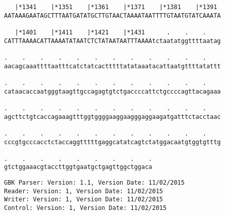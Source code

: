 \documentclass{article}
\begin{document}
\begin{Verbatim}
   |*1341    |*1351    |*1361    |*1371    |*1381    |*1391 
AATAAAGAATAGCTTTAATGATATGCTTGTAACTAAAATAATTTTGTAATGTATCAAATA
  
   |*1401    |*1411    |*1421    |*1431      .    .    .    
CATTTAAAACATTAAAATATAATCTCTATAATAATTTAAAAtctaatatggttttaatag
  
.    .    .    .    .    .    .    .    .    .    .    .    
aacagcaaattttaatttcatctatcactttttatataaatacattaatgttttatattt
  
.    .    .    .    .    .    .    .    .    .    .    .    
cataacaccaatgggtaagttgccagagtgtctgaccccattctgccccagttacagaaa
  
.    .    .    .    .    .    .    .    .    .    .    .    
agcttctgtcaccagaaagtttggtggggaaggaagggaggaagatgatttctacctaac
  
.    .    .    .    .    .    .    .    .    .    .    .    
cccgtgcccacctctaccaggtttttgaggcatatcagtctatggacaatgtggtgtttg
  
.    .    .    .    .    .    .    .    .
gtctggaaacgtaccttggtgaatgctgagttggctggaca
\end{Verbatim}
\newpage
\begin{Verbatim}
GBK Parser: Version: 1.1, Version Date: 11/02/2015
Reader: Version: 1, Version Date: 11/02/2015
Writer: Version: 1, Version Date: 11/02/2015
Control: Version: 1, Version Date: 11/02/2015
\end{Verbatim}
\end{document}
